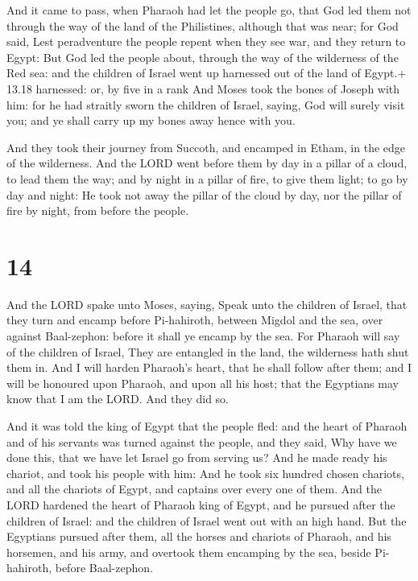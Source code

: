  And it came to pass, when Pharaoh had let the people go,
that God led them not through the way of the land of the Philistines,
although that was near; for God said, Lest peradventure the people
repent when they see war, and they return to Egypt:  But
God led the people about, through the way of the wilderness of the Red
sea: and the children of Israel went up harnessed out of the land of
Egypt.+ 13.18 harnessed: or, by five in a rank  And Moses
took the bones of Joseph with him: for he had straitly sworn the
children of Israel, saying, God will surely visit you; and ye shall
carry up my bones away hence with you.

 And they took their journey from Succoth, and encamped
in Etham, in the edge of the wilderness.  And the LORD went
before them by day in a pillar of a cloud, to lead them the way; and by
night in a pillar of fire, to give them light; to go by day and night:
 He took not away the pillar of the cloud by day, nor the
pillar of fire by night, from before the people.

\hypertarget{section-13}{%
\section{14}\label{section-13}}

 And the LORD spake unto Moses, saying,  Speak
unto the children of Israel, that they turn and encamp before
Pi-hahiroth, between Migdol and the sea, over against Baal-zephon:
before it shall ye encamp by the sea.  For Pharaoh will say
of the children of Israel, They are entangled in the land, the
wilderness hath shut them in.  And I will harden Pharaoh's
heart, that he shall follow after them; and I will be honoured upon
Pharaoh, and upon all his host; that the Egyptians may know that I am
the LORD. And they did so.

 And it was told the king of Egypt that the people fled:
and the heart of Pharaoh and of his servants was turned against the
people, and they said, Why have we done this, that we have let Israel go
from serving us?  And he made ready his chariot, and took
his people with him:  And he took six hundred chosen
chariots, and all the chariots of Egypt, and captains over every one of
them.  And the LORD hardened the heart of Pharaoh king of
Egypt, and he pursued after the children of Israel: and the children of
Israel went out with an high hand.  But the Egyptians
pursued after them, all the horses and chariots of Pharaoh, and his
horsemen, and his army, and overtook them encamping by the sea, beside
Pi-hahiroth, before Baal-zephon.

